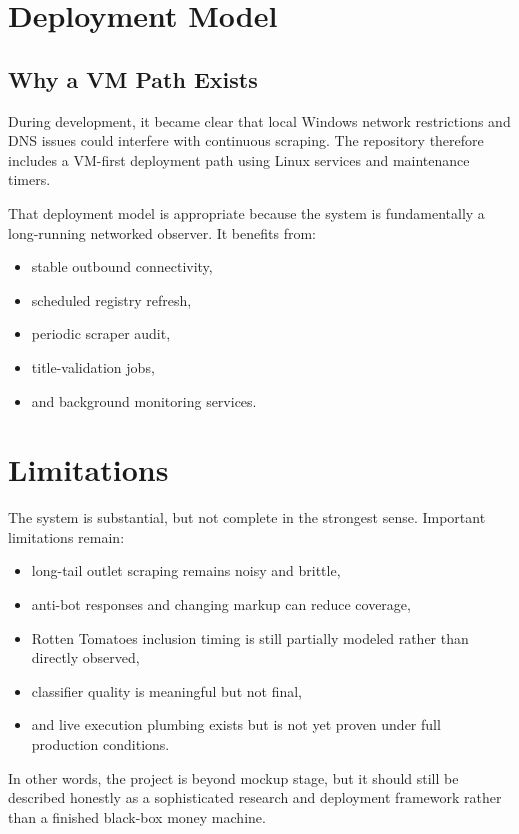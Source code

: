 \documentclass[11pt]{article}
\begin{document}
\section{Deployment Model}
\subsection{Why a VM Path Exists}
During development, it became clear that local Windows network restrictions and DNS issues could interfere with continuous scraping. The repository therefore includes a VM-first deployment path using Linux services and maintenance timers.

That deployment model is appropriate because the system is fundamentally a long-running networked observer. It benefits from:
\begin{itemize}[leftmargin=1.5em]
    \item stable outbound connectivity,
    \item scheduled registry refresh,
    \item periodic scraper audit,
    \item title-validation jobs,
    \item and background monitoring services.
\end{itemize}

\section{Limitations}
The system is substantial, but not complete in the strongest sense. Important limitations remain:
\begin{itemize}[leftmargin=1.5em]
    \item long-tail outlet scraping remains noisy and brittle,
    \item anti-bot responses and changing markup can reduce coverage,
    \item Rotten Tomatoes inclusion timing is still partially modeled rather than directly observed,
    \item classifier quality is meaningful but not final,
    \item and live execution plumbing exists but is not yet proven under full production conditions.
\end{itemize}

In other words, the project is beyond mockup stage, but it should still be described honestly as a sophisticated research and deployment framework rather than a finished black-box money machine.
\end{document}
